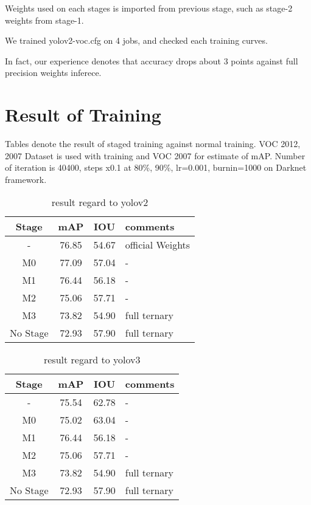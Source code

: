 \documentclass[twocolumn]{article}
\begin{document}
Weights used on each stages is imported from previous stage, such as stage-2 weights from stage-1.

We trained yolov2-voc.cfg on 4 jobs, and checked each training curves.

In fact, our experience denotes that accuracy drops about 3 points against full precision weights inferece.

\section{Result of Training}

Tables denote the result of staged training against normal training.
VOC 2012, 2007 Dataset is used with training and VOC 2007 for estimate of mAP.
Number of iteration is 40400, steps x0.1 at 80\%, 90\%, lr=0.001, burnin=1000 on Darknet framework.

\begin{table}[htbp]
 \centering
 \begin{tabular}{c|c|c|l}
  Stage & mAP & IOU & comments \\ \hline\hline
  -        & 76.85 & 54.67 & official Weights \\ \hline
  M0       & 77.09 & 57.04 & -                \\ \hline
  M1       & 76.44 & 56.18 & -                \\ \hline
  M2       & 75.06 & 57.71 & -                \\ \hline
  M3       & 73.82 & 54.90 & full ternary     \\ \hline\hline
  No Stage & 72.93 & 57.90 & full ternary \\ \hline
 \end{tabular}
 \caption{result regard to yolov2}
 \label{tb:yolov2}
\end{table}


\begin{table}[htbp]
 \centering
 \begin{tabular}{c|c|c|l}
  Stage & mAP & IOU & comments \\ \hline\hline
  -        & 75.54 & 62.78 & -                \\ \hline
  M0       & 75.02 & 63.04 & -                \\ \hline
  M1       & 76.44 & 56.18 & -                \\ \hline
  M2       & 75.06 & 57.71 & -                \\ \hline
  M3       & 73.82 & 54.90 & full ternary     \\ \hline\hline
  No Stage & 72.93 & 57.90 & full ternary \\ \hline
 \end{tabular}
 \caption{result regard to yolov3}
 \label{tb:yolov3}
\end{table}
\end{document}
